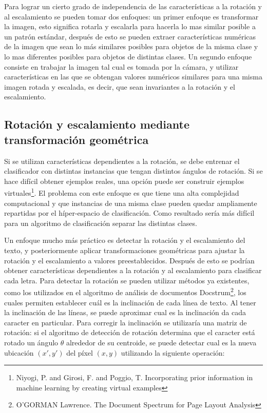 \documentclass[a4paper, 11pt, oneside]{report}
\begin{document}
Para lograr un cierto grado de independencia de las características a la rotación y al escalamiento se pueden tomar dos enfoques: un primer enfoque es transformar la imagen, esto significa rotarla y escalarla para hacerla lo mas similar posible a un patrón estándar, después de esto se pueden extraer características numéricas de la imagen que sean lo más similares posibles para objetos de la misma clase y lo mas diferentes posibles para objetos de distintas clases. Un segundo enfoque consiste en trabajar la imagen tal cual es tomada por la cámara, y utilizar características en las que se obtengan valores numéricos similares para una misma imagen rotada y escalada, es decir, que sean invariantes a la rotación y el escalamiento.

\subsection{Rotación y escalamiento mediante transformación geométrica}
\label{sect:rotation}

Si se utilizan características dependientes a la rotación, se debe entrenar el clasificador con distintas instancias que tengan distintos ángulos de rotación. Si se hace difícil obtener ejemplos reales, una opción puede ser construir ejemplos virtuales\footnote{Niyogi, P. and Girosi, F. and Poggio, T. Incorporating prior information in machine learning by creating virtual examples}. El problema con este enfoque es que tiene una alta complejidad computacional y que instancias de una misma clase pueden quedar ampliamente repartidas por el híper-espacio de clasificación. Como resultado sería más difícil para un algoritmo de clasificación separar las distintas clases.

Un enfoque mucho más práctico es detectar la rotación y el escalamiento del texto, y posteriormente aplicar transformaciones geométricas para ajustar la rotación y el escalamiento a valores preestablecidos. Después de esto se podrían obtener características dependientes a la rotación y al escalamiento para clasificar cada letra. Para detectar la rotación se pueden utilizar métodos ya existentes, como los utilizados en el algoritmo de análisis de documentos Docstrum\footnote{O'GORMAN Lawrence. The Document Spectrum for Page Layout Analysis}, los cuales permiten establecer cuál es la inclinación de cada línea de texto. Al tener la inclinación de las líneas, se puede aproximar cual es la inclinación da cada caracter en particular. Para corregir la inclinación se utilizaría una matriz de rotación: si el algoritmo de detección de rotación determina que el caracter está rotado un ángulo $\theta$ alrededor de su centroide, se puede detectar cual es la nueva ubicación $(x', y')$ del píxel $(x, y)$ utilizando la siguiente operación:
\end{document}
